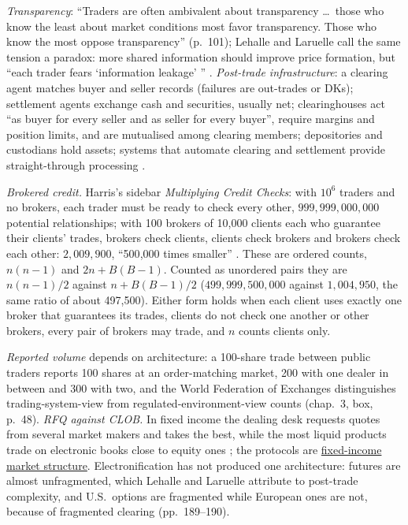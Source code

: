 \begin{qfdefinition}
\emph{Transparency}: ``Traders are often ambivalent about transparency \dots\ those who know the least about market conditions most favor transparency. Those who know the most oppose transparency'' (p.~101); Lehalle and Laruelle call the same tension a paradox: more shared information should improve price formation, but ``each trader fears `information leakage' '' \citep[Introduction, pp.~19--20]{alpha-laruelle}. \emph{Post-trade infrastructure}: a clearing agent matches buyer and seller records (failures are out-trades or DKs); settlement agents exchange cash and securities, usually net; clearinghouses act ``as buyer for every seller and as seller for every buyer'', require margins and position limits, and are mutualised among clearing members; depositories and custodians hold assets; systems that automate clearing and settlement provide straight-through processing \citep[chap.~3, sec.~3.2.2, pp.~35--38]{alpha-harris}.

 \emph{Brokered credit.} Harris's sidebar \emph{Multiplying Credit Checks}: with $10^6$ traders and no brokers, each trader must be ready to check every other, $999{,}999{,}000{,}000$ potential relationships; with 100 brokers of 10{,}000 clients each who guarantee their clients' trades, brokers check clients, clients check brokers and brokers check each other: $2{,}009{,}900$, ``500{,}000 times smaller'' \citep[chap.~7, p.~142]{alpha-harris}. These are ordered counts, $n(n-1)$ and $2n+B(B-1)$. Counted as unordered pairs they are $n(n-1)/2$ against $n+B(B-1)/2$ ($499{,}999{,}500{,}000$ against $1{,}004{,}950$, the same ratio of about 497{,}500). Either form holds when each client uses exactly one broker that guarantees its trades, clients do not check one another or other brokers, every pair of brokers may trade, and $n$ counts clients only.

\emph{Reported volume} depends on architecture: a 100-share trade between public traders reports 100 shares at an order-matching market, 200 with one dealer in between and 300 with two, and the World Federation of Exchanges distinguishes trading-system-view from regulated-environment-view counts (chap.~3, box, p.~48). \emph{RFQ against CLOB.} In fixed income the dealing desk requests quotes from several market makers and takes the best, while the most liquid products trade on electronic books close to equity ones \citep[chap.~2, sec.~2.6, pp.~190--191]{alpha-laruelle}; the protocols are \hyperref[def:fixed-income-market-structure]{fixed-income market structure}. Electronification has not produced one architecture: futures are almost unfragmented, which Lehalle and Laruelle attribute to post-trade complexity, and U.S.\ options are fragmented while European ones are not, because of fragmented clearing (pp.~189--190).


\end{qfdefinition}
